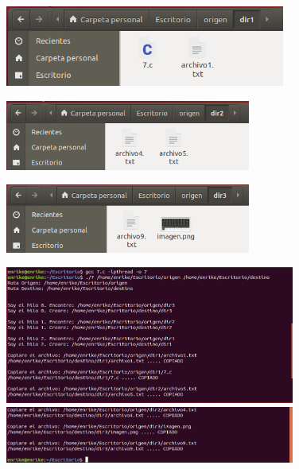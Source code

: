 \documentclass[12pt]{article}
\begin{document}
\begin{itemize}
			         \begin{figure}[h!]
			          \centering \includegraphics[width=0.82\textwidth]{Practica5/Images/linux/7_4.png}
			         \end{figure}
			         
			         \begin{figure}[h!]
			          \centering \includegraphics[width=0.72\textwidth]{Practica5/Images/linux/7_6.png}
			         \end{figure}
			         
			         \begin{figure}[h!]
			          \centering \includegraphics[width=0.72\textwidth]{Practica5/Images/linux/7_7.png}
			         \end{figure}
			         
			         \begin{figure}[h!]
			          \centering \includegraphics[width=0.85\textwidth]{Practica5/Images/linux/7_1.png}
                     \includegraphics[width=0.85\textwidth]{Practica5/Images/linux/7_2.png}
			         \end{figure}
			         

\end{itemize}
\end{document}
